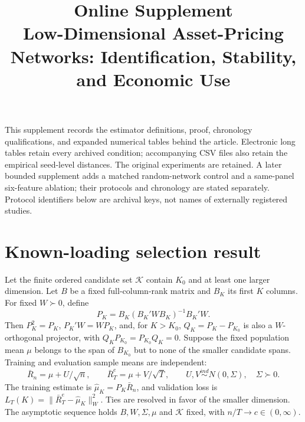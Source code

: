 \documentclass[11pt]{article}
\title{Online Supplement\\[6pt]\large Low-Dimensional Asset-Pricing Networks: Identification, Stability, and Economic Use}
\author{}
\date{}
\begin{document}
\maketitle
\vspace{-2em}
This supplement records the estimator definitions, proof, chronology qualifications, and expanded numerical tables behind the article. Electronic long tables retain every archived condition; accompanying CSV files also retain the empirical seed-level distances. The original experiments are retained. A later bounded supplement adds a matched random-network control and a same-panel six-feature ablation; their protocols and chronology are stated separately. Protocol identifiers below are archival keys, not names of externally registered studies.

\section{Known-loading selection result}
\setcounter{equation}{0}
Let the finite ordered candidate set $\mathcal K$ contain $K_0$ and at least one larger dimension. Let $B$ be a fixed full-column-rank matrix and $B_K$ its first $K$ columns. For fixed $W\succ0$, define
\begin{equation}
P_K=B_K(B_K'WB_K)^{-1}B_K'W.
\end{equation}
Then $P_K^2=P_K$, $P_K'W=WP_K$, and, for $K>K_0$, $Q_K=P_K-P_{K_0}$ is also a $W$-orthogonal projector, with $Q_KP_{K_0}=P_{K_0}Q_K=0$. Suppose the fixed population mean $\mu$ belongs to the span of $B_{K_0}$ but to none of the smaller candidate spans. Training and evaluation sample means are independent:
\begin{equation}
\bar R_n=\mu+U/\sqrt n,\qquad \bar R_T^e=\mu+V/\sqrt T,
\qquad U,V\stackrel{ind}{\sim}N(0,\Sigma),\quad\Sigma\succ0.
\end{equation}
The training estimate is $\widehat\mu_K=P_K\bar R_n$, and validation loss is $L_T(K)=\|\bar R_T^e-\widehat\mu_K\|_W^2$. Ties are resolved in favor of the smaller dimension. The asymptotic sequence holds $B,W,\Sigma,\mu$ and $\mathcal K$ fixed, with $n/T\to c\in(0,\infty)$.
\end{document}
